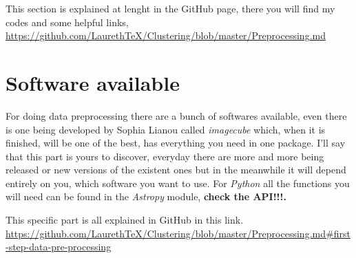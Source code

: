 \documentclass[11pt,fleqn]{book} %
\begin{document}
																																																																																																																																																																																																														    This section is explained at lenght in the GitHub page, there you will find my codes and some helpful links, \url{https://github.com/LaurethTeX/Clustering/blob/master/Preprocessing.md}

																																																																																																																																																																																																														    \section{Software available}
																																																																																																																																																																																																														    For doing data preprocessing there are a bunch of softwares available, even there is one being developed by Sophia Lianou called \emph{imagecube} which, when it is finished, will be one of the best, has everything you need in one package. I'll say that this part is yours to discover, everyday there are more and more being released or new versions of the existent ones but in the meanwhile it will depend entirely on you, which software you want to use. For \emph{Python} all the functions you will need can be found in the \emph{Astropy} module, \textbf{check the API!!!.}


																																																																																																																																																																																																														    This specific part is all explained in GitHub in this link. \url{https://github.com/LaurethTeX/Clustering/blob/master/Preprocessing.md#first-step-data-pre-processing}
\end{document}
